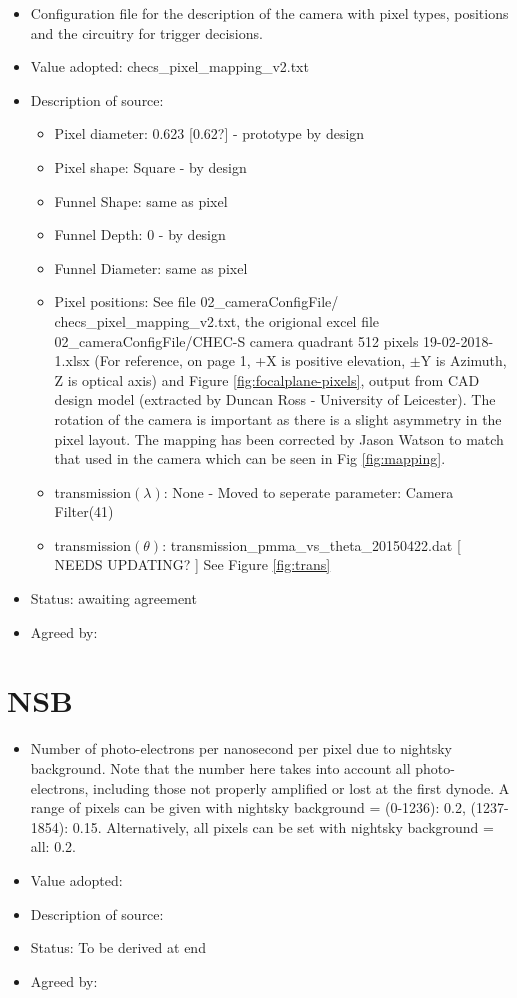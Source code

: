 \documentclass[GCT,short]{gct}
\begin{document}
\begin{itemize}
\item  Configuration file for the description of the camera with pixel types, positions and the circuitry for trigger decisions.
\item Value adopted: checs\_pixel\_mapping\_v2.txt
\item Description of source: 
\begin{itemize}
\item Pixel diameter: \color{red} 0.623 [0.62?] \color{black}- prototype by design
\item Pixel shape:  Square - by design
\item Funnel Shape: same as pixel
\item Funnel Depth: 0 - by design
\item Funnel Diameter: same as pixel
\item Pixel positions: See file 02\_cameraConfigFile/ checs\_pixel\_mapping\_v2.txt, the origional excel file 02\_cameraConfigFile/CHEC-S camera quadrant 512 pixels 19-02-2018-1.xlsx (For reference, on page 1, +X is positive elevation, $\pm$Y is Azimuth, Z is optical axis) and Figure \ref{fig:focalplane-pixels}, output from CAD design model (extracted by Duncan Ross - University of Leicester). The rotation of the camera is important as there is a slight asymmetry in the pixel layout. The mapping has been corrected by Jason Watson to match that used in the camera which can be seen in Fig \ref{fig:mapping}.
\item transmission$(\lambda)$:  None - Moved to seperate parameter: Camera Filter(41)
\item transmission$(\theta)$: transmission\_pmma\_vs\_theta\_20150422.dat [\color{red} NEEDS UPDATING?\color{black} ] See Figure \ref{fig:trans}
\end{itemize}
\item Status: \color{orange}awaiting agreement\color{black}
\item Agreed by: 
\end{itemize}



\section{NSB}
\begin{itemize}
\item Number of photo-electrons per nanosecond per pixel due to nightsky background. Note that the number here takes into account all photo-electrons, including those not properly amplified or lost at the first dynode. A range of pixels can be given with nightsky background = (0-1236): 0.2, (1237-1854): 0.15. Alternatively, all pixels can be set with nightsky background = all: 0.2.
\item Value adopted: 
\item Description of source: 
\item Status: To be derived at end
\item Agreed by: 
\end{itemize}
\end{document}
